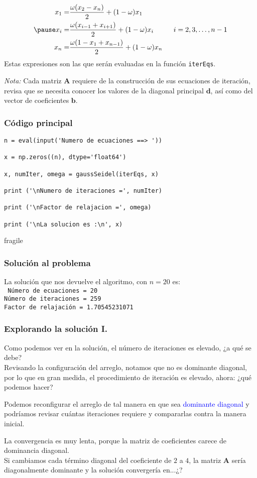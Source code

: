 \begin{frame}
\[ \begin{split}
x_{1} =& \dfrac{\omega(x_{2}-x_{n})}{2} + (1 - \omega)x_{1} \\
\pause
x_{i} =& \dfrac{\omega(x_{i-1}+x_{i+1})}{2} + (1 - \omega)x_{i} \hspace{1cm} i=2,3,\ldots,n-1 \\
x_{n} =& \dfrac{\omega(1-x_{1} + x_{n-1})}{2} + (1-\omega)x_{n}
\end{split} \]
Estas expresiones son las que serán evaluadas en la función \texttt{iterEqs}.
\end{frame}
\begin{frame}
\emph{Nota: } Cada matriz $\mathbf{A}$ requiere de la construcción de sus ecuaciones de iteración, revisa que se necesita conocer los valores de la diagonal principal $\mathbf{d}$, así como del vector de coeficientes $\mathbf{b}$.
\end{frame}
\begin{frame}[fragile]
\frametitle{Código principal}
\begin{lstlisting}[basicstyle=\linespread{0.9}\ttfamily\small, columns=fullflexible]
n = eval(input('Numero de ecuaciones ==> '))

x = np.zeros((n), dtype='float64')

x, numIter, omega = gaussSeidel(iterEqs, x)

print ('\nNumero de iteraciones =', numIter)

print ('\nFactor de relajacion =', omega)

print ('\nLa solucion es :\n', x)
\end{lstlisting}
\end{frame}
\begin{frame}{fragile}
\frametitle{Solución al problema}
La solución que nos devuelve el algoritmo, con $n=20$ es:
\\
\medskip
\texttt{
Número de ecuaciones = 20 
\\
\medskip
Número de iteraciones = 259 
\\
\medskip
Factor de relajación = 1.70545231071
}
\end{frame}
\begin{frame}
\frametitle{Explorando la solución I.}
Como podemos ver en la solución, el número de iteraciones es elevado, ¿a qué se debe?
\\
\medskip
Revisando la configuración del arreglo, notamos que no es dominante diagonal, por lo que en gran medida, el procedimiento de iteración es elevado, ahora: ¿qué podemos hacer?
\end{frame}
\begin{frame}
Podemos reconfigurar el arreglo de tal manera en que sea \textcolor{blue}{dominante diagonal} y podríamos revisar cuántas iteraciones requiere y compararlas contra la manera inicial.
\end{frame}
\begin{frame}
La convergencia es muy lenta, porque la matriz de coeficientes carece de dominancia diagonal.
\\
\bigskip
Si cambiamos cada término diagonal del coeficiente de $2$ a $4$, la matriz $\mathbf{A}$ sería diagonalmente dominante y la solución convergería en...¿?
\end{frame}
